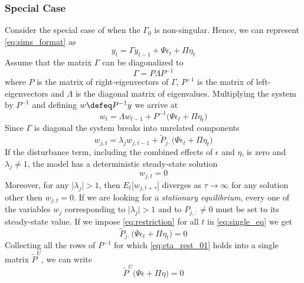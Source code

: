 \documentclass[a4paper,10pt]{article}  %
\begin{document}
\subsubsection{Special Case} %
\label{sub:special_case}

Consider the special case of when the $ \Gamma_0 $ is non-singular. Hence, we can represent \eqref{eq:sims_format} as
\[
   y_t = \Gamma y_{t-1} + \Psi \epsilon_t +\Pi \eta_t
\]
Assume that the matrix $ \Gamma $ can be diagonalized to
\[
   \Gamma = P \Lambda P^{-1}
\]
where $ P $ is the matrix of right-eigenvectors of $ \Gamma $, $ P^{-1} $ is the matrix of left-eigenvectors
and $ \Lambda $ is the diagonal matrix of eigenvalues. Multiplying the system by $ P^{-1} $ and defining $ w \defeq P^{-1} y $
we arrive at
\begin{equation}
   \label{eq:diag_system}
   w_t = \Lambda w_{t-1} + P^{-1} \Big( \Psi \epsilon_t + \Pi \eta_t \Big)
\end{equation}
Since $\Gamma$ is diagonal the system breaks into unrelated components
\begin{equation}
   \label{eq:single_eq}
   w_{j,t} = \lambda_j w_{j,t-1} + \tilde{P}_{j\cdot} \Big( \Psi \epsilon_t + \Pi \eta_t \Big)
\end{equation}
If the disturbance term, including the combined effects of $\epsilon$ and $\eta$, is zero and $ \lambda_j \ne 1$, the model has a
deterministic steady-state solution
\begin{equation}
   \label{eq:restriction}
   w_{j,t} = 0 
\end{equation}
Moreover, for any $ \lvert \lambda_j \rvert > 1$, then $ E_t\big[ w_{j,t+\tau} \big] $ diverges as $ \tau\rightarrow \infty $ for any
solution other then $ w_{j,t} = 0 $. If we are looking for a \emph{stationary equilibrium}, every one of 
the variables $ w_j $ corresponding to $ \lvert \lambda_j \rvert > 1 $ and to $ P_{j,:}\ne 0 $ must be set to its steady-state value. 
If we impose \eqref{eq:restriction} for all $ t $ in \eqref{eq:single_eq} we get
\begin{equation}
   \label{eq:eta_rest_01}
   \tilde{P}_{j\cdot} \Big( \Psi \epsilon_t + \Pi \eta_t \Big) = 0 
\end{equation}
Collecting all the rows of $ P^{-1} $ for which \eqref{eq:eta_rest_01} holds into a single matrix $ \tilde{P}^U $, 
we can write
\begin{equation}
   \label{eq:eta_rest_02}
   \tilde{P}^U \Big( \Psi \epsilon + \Pi \eta \Big) = 0
\end{equation}
\end{document}
